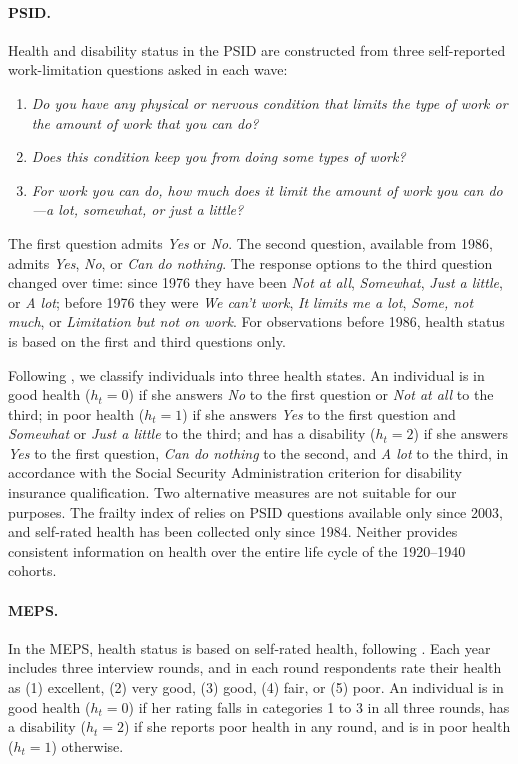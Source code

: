 \paragraph{PSID.} Health and disability status in the PSID are constructed from three self-reported work-limitation questions asked in each wave:
\begin{enumerate}[label=(\arabic*)]
\item \textit{Do you have any physical or nervous condition that limits the type of work or the amount of work that you can do?}
\item \textit{Does this condition keep you from doing some types of work?}
\item \textit{For work you can do, how much does it limit the amount of work you can do---a lot, somewhat, or just a little?}
\end{enumerate}
The first question admits \textit{Yes} or \textit{No}. The second question, available from 1986, admits \textit{Yes}, \textit{No}, or \textit{Can do nothing}. %
The response options to the third question changed over time: since 1976 they have been \textit{Not at all}, \textit{Somewhat}, \textit{Just a little}, or \textit{A lot}; before 1976 they were \textit{We can't work}, \textit{It limits me a lot}, \textit{Some, not much}, or \textit{Limitation but not on work}. %
For observations before 1986, health status is based on the first and third questions only.

Following \citet{Low2015}, we classify individuals into three health states. An individual is in good health ($h_t=0$) if she answers \textit{No} to the first question or \textit{Not at all} to the third; in poor health ($h_t=1$) if she answers \textit{Yes} to the first question and \textit{Somewhat} or \textit{Just a little} to the third; and has a disability ($h_t=2$) if she answers \textit{Yes} to the first question, \textit{Can do nothing} to the second, and \textit{A lot} to the third, in accordance with the Social Security Administration criterion for disability insurance qualification. Two alternative measures are not suitable for our purposes. The frailty index of \citet{Hosseini2021} relies on PSID questions available only since 2003, and self-rated health has been collected only since 1984. %
Neither provides consistent information on health over the entire life cycle of the 1920--1940 cohorts.

\paragraph{MEPS.} In the MEPS, health status is based on self-rated health, following \citet{Pashchenko2019}. Each year includes three interview rounds, and in each round respondents rate their health as (1) excellent, (2) very good, (3) good, (4) fair, or (5) poor. An individual is in good health ($h_t=0$) if her rating falls in categories 1 to 3 in all three rounds, has a disability ($h_t=2$) if she reports poor health in any round, and is in poor health ($h_t=1$) otherwise.

